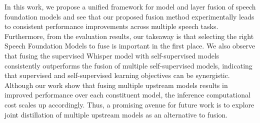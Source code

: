 In this work, we propose a unified framework for model and layer fusion of speech foundation models and see that our proposed fusion method experimentally leads to consistent performance improvements across multiple speech tasks.  
Furthermore, from the evaluation results, our takeaway is that selecting the right Speech Foundation Models to fuse is important in the first place. 
We also observe that fusing the supervised Whisper model with self-supervised models consistently outperforms the fusion of multiple self-supervised models, indicating that supervised and self-supervised learning objectives can be synergistic.
Although our work show that fusing multiple upstream models results in improved performance over each constituent model, the inference computational cost scales up accordingly. Thus, a promising avenue for future work is to explore joint distillation of multiple upstream models as an alternative to fusion.
